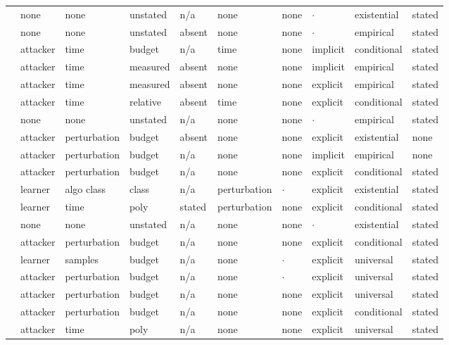 \begin{landscape}
\begin{longtable}{rlllllllll}
\cite{TJSP22} & none & none & unstated & n/a & none & none & $\cdot$ & existential & stated \\
\cite{KCC23} & none & none & unstated & absent & none & none & $\cdot$ & empirical & stated \\
\cite{ZFWCSXZ26} & attacker & time & budget & n/a & time & none & implicit & conditional & stated \\
\cite{FJTYCDCP23} & attacker & time & measured & absent & none & none & implicit & empirical & stated \\
\cite{DJYWWMNL26} & attacker & time & measured & absent & none & none & explicit & empirical & stated \\
\cite{JYCDTCP21} & attacker & time & relative & absent & time & none & explicit & conditional & stated \\
\cite{SHKBL25} & none & none & unstated & n/a & none & none & $\cdot$ & empirical & stated \\
\cite{TCBM20} & attacker & perturbation & budget & absent & none & none & explicit & existential & none \\
\cite{CGBSHC22} & attacker & perturbation & budget & n/a & none & none & implicit & empirical & none \\
\cite{SLDLN25} & attacker & perturbation & budget & n/a & none & none & explicit & conditional & stated \\
\cite{BPR19} & learner & algo class & class & n/a & perturbation & $\cdot$ & explicit & existential & stated \\
\cite{BLPR18} & learner & time & poly & stated & perturbation & none & explicit & conditional & stated \\
\cite{GMFSRWG18} & none & none & unstated & n/a & none & none & $\cdot$ & existential & stated \\
\cite{FFF18} & attacker & perturbation & budget & n/a & none & none & explicit & conditional & stated \\
\cite{AH23} & learner & samples & budget & n/a & none & $\cdot$ & explicit & universal & stated \\
\cite{LAGHJ19} & attacker & perturbation & budget & n/a & none & $\cdot$ & explicit & universal & stated \\
\cite{CRK19} & attacker & perturbation & budget & n/a & none & none & explicit & universal & stated \\
\cite{Mah19} & attacker & perturbation & budget & n/a & none & none & explicit & conditional & stated \\
\cite{EMM20} & attacker & time & poly & n/a & none & none & explicit & universal & stated \\

\end{longtable}
\end{landscape}
